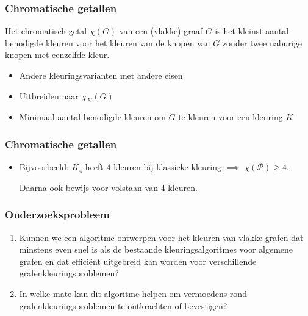 \documentclass
[kulak] %
{kulakbeamer}
\begin{document}
	\begin{frame}
		\frametitle{Chromatische getallen}
		
		\begin{definition}
			Het chromatisch getal $\chi(G)$ van een (vlakke) graaf $G$ is het kleinst aantal benodigde kleuren voor het kleuren van de knopen van $G$ zonder twee naburige knopen met eenzelfde kleur.
		\end{definition}
		\begin{itemize}
			\item Andere kleuringsvarianten met andere eisen
			\item Uitbreiden naar $\chi_{K}(G)$
			\item Minimaal aantal benodigde kleuren om $G$ te kleuren voor een kleuring $K$
			
		\end{itemize}
	\end{frame}
	
	\begin{frame}
		\frametitle{Chromatische getallen}
		\begin{itemize}
			\begin{definition}
				Het chromatisch getal $\chi_{K}(\mathcal{P})$ voor een kleuring $K$ voor de klasse van vlakke grafen $\mathcal{P}$, is het minimaal benodigd aantal kleuren om een willekeurige graaf binnen die klasse te kunnen kleuren voor de kleuring $K$.
			\end{definition}
			\pause
			\item Bijvoorbeeld: $K_4$ heeft $4$ kleuren bij klassieke kleuring $\implies$ $\chi(\mathcal{P}) \ge 4$. 
			
			Daarna ook bewijs voor volstaan van $4$ kleuren.
		\end{itemize}
		
	\end{frame}
	
	\begin{frame}
		\frametitle{Onderzoeksprobleem}
		
		\begin{enumerate}
			\item Kunnen we een algoritme ontwerpen voor het kleuren van vlakke grafen dat minstens even snel is als de bestaande kleuringsalgoritmes voor algemene grafen en dat efficiënt uitgebreid kan worden voor verschillende grafenkleuringsproblemen?\pause
			\item In welke mate kan dit algoritme helpen om vermoedens rond  grafenkleuringsproblemen te ontkrachten of bevestigen?
		\end{enumerate}
		
	\end{frame}
	
\end{document}
